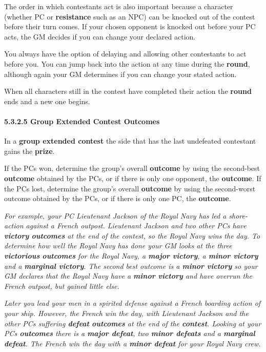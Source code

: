 \documentclass[
]{article}
\begin{document}
The order in which contestants act is also important because a character
(whether PC or \textbf{resistance} such as an NPC) can be knocked out of
the contest before their turn comes. If your chosen opponent is knocked
out before your PC acts, the GM decides if you can change your declared
action.

You always have the option of delaying and allowing other contestants to
act before you. You can jump back into the action at any time during the
\textbf{round}, although again your GM determines if you can change your
stated action.

When all characters still in the contest have completed their action the
\textbf{round} ends and a new one begins.

\hypertarget{group-extended-contest-outcomes}{%
\paragraph{5.3.2.5 Group Extended Contest
Outcomes}\label{group-extended-contest-outcomes}}

In a \textbf{group extended contest} the side that has the last
undefeated contestant gains the \textbf{prize}.

If the PCs won, determine the group's overall \textbf{outcome} by using
the second-best \textbf{outcome} obtained by the PCs, or if there is
only one opponent, the \textbf{outcome}. If the PCs lost, determine the
group's overall \textbf{outcome} by using the second-worst outcome
obtained by the PCs, or if there is only one PC, the \textbf{outcome}.

\emph{For example, your PC Lieutenant Jackson of the Royal Navy has led
a shore-action against a French outpost. Lieutenant Jackson and two
other PCs have \textbf{victory} \textbf{outcomes} at the end of the
contest, so the Royal Navy wins the day. To determine how well the Royal
Navy has done your GM looks at the three \textbf{victorious}
\textbf{outcomes} for the Royal Navy, a \textbf{major victory}, a
\textbf{minor victory} and a \textbf{marginal victory}. The second best
outcome is a \textbf{minor victory} so your GM declares that the Royal
Navy have a \textbf{minor victory} and have overrun the French outpost,
but gained little else.}

\emph{Later you lead your men in a spirited defense against a French
boarding action of your ship. However, the French win the day, with
Lieutenant Jackson and the other PCs suffering \textbf{defeat}
\textbf{outcomes} at the end of the \textbf{contest}. Looking at your
PCs \textbf{outcomes} there is a \textbf{major defeat}, two
\textbf{minor defeats} and a \textbf{marginal defeat}. The French win
the day with a \textbf{minor defeat} for your Royal Navy crew.}
\end{document}
